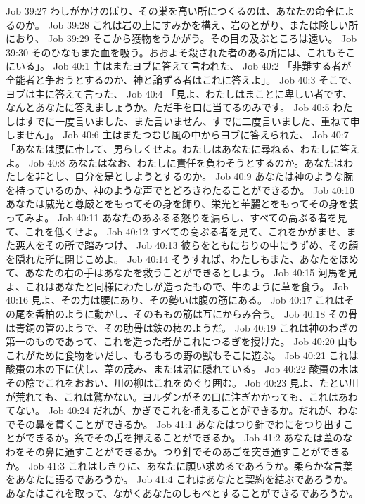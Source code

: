 Job 39:27  わしがかけのぼり、その巣を高い所につくるのは、あなたの命令によるのか。
Job 39:28  これは岩の上にすみかを構え、岩のとがり、または険しい所におり、
Job 39:29  そこから獲物をうかがう。その目の及ぶところは遠い。
Job 39:30  そのひなもまた血を吸う。おおよそ殺された者のある所には、これもそこにいる」。
Job 40:1  主はまたヨブに答えて言われた、
Job 40:2  「非難する者が全能者と争おうとするのか、神と論ずる者はこれに答えよ」。
Job 40:3  そこで、ヨブは主に答えて言った、
Job 40:4  「見よ、わたしはまことに卑しい者です、なんとあなたに答えましょうか。ただ手を口に当てるのみです。
Job 40:5  わたしはすでに一度言いました、また言いません、すでに二度言いました、重ねて申しません」。
Job 40:6  主はまたつむじ風の中からヨブに答えられた、
Job 40:7  「あなたは腰に帯して、男らしくせよ。わたしはあなたに尋ねる、わたしに答えよ。
Job 40:8  あなたはなお、わたしに責任を負わそうとするのか。あなたはわたしを非とし、自分を是としようとするのか。
Job 40:9  あなたは神のような腕を持っているのか、神のような声でとどろきわたることができるか。
Job 40:10  あなたは威光と尊厳とをもってその身を飾り、栄光と華麗とをもってその身を装ってみよ。
Job 40:11  あなたのあふるる怒りを漏らし、すべての高ぶる者を見て、これを低くせよ。
Job 40:12  すべての高ぶる者を見て、これをかがませ、また悪人をその所で踏みつけ、
Job 40:13  彼らをともにちりの中にうずめ、その顔を隠れた所に閉じこめよ。
Job 40:14  そうすれば、わたしもまた、あなたをほめて、あなたの右の手はあなたを救うことができるとしよう。
Job 40:15  河馬を見よ、これはあなたと同様にわたしが造ったもので、牛のように草を食う。
Job 40:16  見よ、その力は腰にあり、その勢いは腹の筋にある。
Job 40:17  これはその尾を香柏のように動かし、そのももの筋は互にからみ合う。
Job 40:18  その骨は青銅の管のようで、その肋骨は鉄の棒のようだ。
Job 40:19  これは神のわざの第一のものであって、これを造った者がこれにつるぎを授けた。
Job 40:20  山もこれがために食物をいだし、もろもろの野の獣もそこに遊ぶ。
Job 40:21  これは酸棗の木の下に伏し、葦の茂み、または沼に隠れている。
Job 40:22  酸棗の木はその陰でこれをおおい、川の柳はこれをめぐり囲む。
Job 40:23  見よ、たとい川が荒れても、これは驚かない。ヨルダンがその口に注ぎかかっても、これはあわてない。
Job 40:24  だれが、かぎでこれを捕えることができるか。だれが、わなでその鼻を貫くことができるか。
Job 41:1  あなたはつり針でわにをつり出すことができるか。糸でその舌を押えることができるか。
Job 41:2  あなたは葦のなわをその鼻に通すことができるか。つり針でそのあごを突き通すことができるか。
Job 41:3  これはしきりに、あなたに願い求めるであろうか。柔らかな言葉をあなたに語るであろうか。
Job 41:4  これはあなたと契約を結ぶであろうか。あなたはこれを取って、ながくあなたのしもべとすることができるであろうか。
